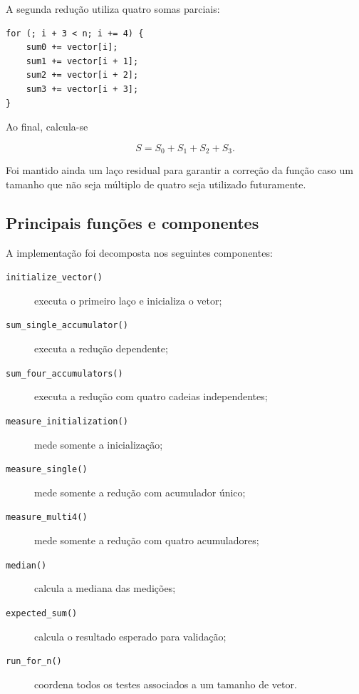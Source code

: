 A segunda redução utiliza quatro somas parciais:

\begin{verbatim}
for (; i + 3 < n; i += 4) {
    sum0 += vector[i];
    sum1 += vector[i + 1];
    sum2 += vector[i + 2];
    sum3 += vector[i + 3];
}
\end{verbatim}

Ao final, calcula-se

\begin{equation}
S = S_0+S_1+S_2+S_3.
\end{equation}

Foi mantido ainda um laço residual para garantir a correção da função caso um tamanho que não
seja múltiplo de quatro seja utilizado futuramente.


\subsection{Principais funções e componentes}

A implementação foi decomposta nos seguintes componentes:

\begin{description}
    \item[\texttt{initialize\_vector()}] executa o primeiro laço e inicializa o vetor;
    
    \item[\texttt{sum\_single\_accumulator()}] executa a redução dependente;
    
    \item[\texttt{sum\_four\_accumulators()}] executa a redução com quatro cadeias
    independentes;
    
    \item[\texttt{measure\_initialization()}] mede somente a inicialização;
    
    \item[\texttt{measure\_single()}] mede somente a redução com acumulador único;
    
    \item[\texttt{measure\_multi4()}] mede somente a redução com quatro acumuladores;
    
    \item[\texttt{median()}] calcula a mediana das medições;
    
    \item[\texttt{expected\_sum()}] calcula o resultado esperado para validação;
    
    \item[\texttt{run\_for\_n()}] coordena todos os testes associados a um tamanho de vetor.
\end{description}


